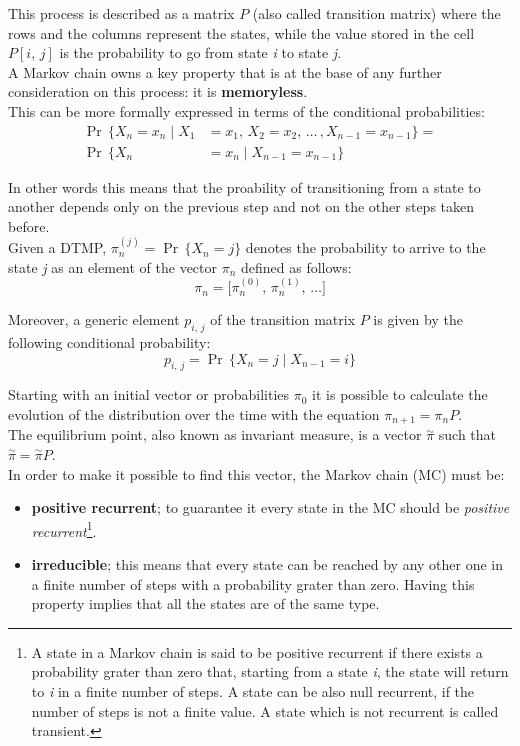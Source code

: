 This process is described as a matrix \( P \) (also called transition matrix) where the rows and the columns represent the states, while the value stored in the cell \( P[i,\,j] \) is the probability to go from state \emph{i} to state \emph{j}.\\
A Markov chain owns a key property that is at the base of any further consideration on this process: it is \textbf{memoryless}.\\
This can be more formally expressed in terms of the conditional probabilities:
\begin{equation} \tag{3} \label{memoryless}
\begin{split}
  \Pr\,\{X_{n} = x_{n} \mid X_{1} &= x_{1},\,X_{2} = x_{2},\,\dots\,, X_{n-1} = x_{n-1} \} =\\
  \Pr\,\{X_{n} &= x_{n} \mid X_{n-1} = x_{n-1}  \}
\end{split}
\end{equation}

In other words this means that the proability of transitioning from a state to another depends only on the previous step and not on the other steps taken before.\\
Given a DTMP, \( \pi_{n}^{(j)} = \Pr\,\{X_{n} = j\}\) denotes the probability to arrive to the state \emph{j} as an element of the vector \( \pi_{n} \) defined as follows:
\begin{equation*}
  \pi_{n} =  \big[\pi_{n}^{(0)},\,\pi_{n}^{(1)},\,\dots \big]
\end{equation*}

Moreover, a generic element \(p_{i,\,j}\) of the transition matrix \( P \) is given by the following conditional probability:
\begin{equation*}
  p_{i,\,j} = \Pr\,\{X_{n} = j \mid X_{n-1} = i\}
\end{equation*}

Starting with an initial vector or probabilities \( \pi_{0} \) it is possible to calculate the evolution of the distribution over the time with the equation \( \pi_{n+1} = \pi_{n}P \).\\
The equilibrium point, also known as invariant measure, is a vector \( \overset{\sim}{\pi} \) such that \( \overset{\sim}{\pi} = \overset{\sim}{\pi}P \).\\
In order to make it possible to find this vector, the Markov chain (MC) must be:
\begin{itemize}
  \item \textbf{positive recurrent}; to guarantee it every state in the MC should be \emph{positive recurrent}\footnote{A state in a Markov chain is said to be positive recurrent if there exists a probability grater than zero that, starting from a state \emph{i}, the state will return to \emph{i} in a finite number of steps. A state can be also null recurrent, if the number of steps is not a finite value. A state which is not recurrent is called transient.}. 
  \item \textbf{irreducible}; this means that every state can be reached by any other one in a finite number of steps with a probability grater than zero. Having this property implies that all the states are of the same type.  
\end{itemize}

